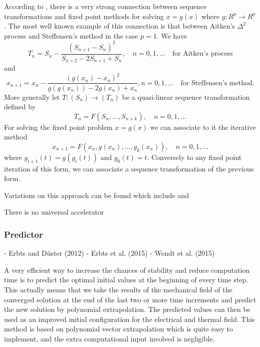 According to \cite{brezinski}, there is a very strong connection between sequence transformations and fixed point methods for solving \(x=g(x)\) where \(g: R^{p} \to R^{p}\).
The most well known example of this connection is that between Aitken's \(\Delta^{2}\) process and Steffensen's method in the case \(p=1\).
We have
\[T_{n}=S_{n}-\frac{\left(S_{n+1}-S_{n}\right)^{2}}{S_{n+2}-2 S_{n+1}+S_{n}}, \quad n=0,1, \ldots \quad\text{for Aitken's process}\]
and
\[x_{n+1}=x_{n}-\frac{\left(g\left(x_{n}\right)-x_{n}\right)^{2}}{g\left(g\left(x_{n}\right)\right)-2 g\left(x_{n}\right)+x_{n}}, n=0,1, \ldots \quad\text{for Steffensen's method.}\]
More generally let \(T:\left(S_{n}\right) \to\left(T_{n}\right)\) be a quasi-linear sequence transformation defined by
\[
T_{n}=F\left(S_{n}, \ldots, S_{n+k}\right), \quad n=0,1, \ldots
\]
For solving the fixed point problem \(x=g(x)\) we can associate to it the iterative method
\[
x_{n+1}=F\left(x_{n}, g\left(x_{n}\right), \ldots, g_{k}\left(x_{n}\right)\right), \quad n=0,1, \ldots
\]
where \(g_{i+1}(t)=g\left(g_{i}(t)\right)\) and \(g_{0}(t)=t\).
Conversely to any fixed point iteration of this form, we can associate a sequence transformation of the previous form.

Variations on this approach can be found which include \cite{irons_version_1969} and \cite{king}

There is no universal accelerator \cite{brezinski}





\subsubsection{Predictor}

- Erbts and Düster (2012)
- Erbts et al. (2015)
- Wendt et al. (2015)

A very efficient way to increase the chances of stability and reduce computation time is to predict the optimal initial values at the beginning of every time step. This actually means that we take the results of the mechanical field of the converged solution at the end of the last two or more time increments and predict the new solution by polynomial extrapolation. The predicted values can then be used as an improved initial configuration for the electrical and thermal field. This method is based on polynomial vector extrapolation which is quite easy to implement, and the extra computational input involved is negligible.

